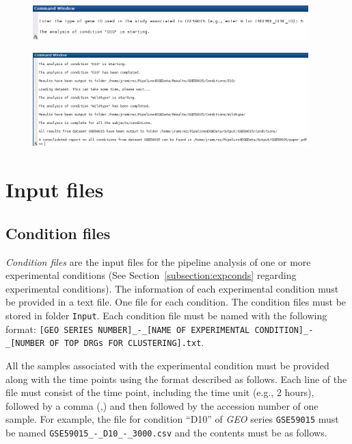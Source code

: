 \documentclass[final,letterpaper,12pt]{article}
\begin{document}
\begin{figure}
	\centering
	\includegraphics[width=0.95\textwidth]{pipeline_ex5}
	\caption{}
	\label{fig:pipeline_ex5}
\end{figure}


\begin{figure}
	\centering
	\includegraphics[width=0.95\textwidth]{pipeline_ex6}
	\caption{}
	\label{fig:pipeline_ex6}
\end{figure}







\section{Input files}
\label{section:input_files}

\subsection{Condition files}
\label{section:condition_files}

\par \emph{Condition files} are the input files for the pipeline analysis of one or more experimental conditions (See Section~\ref{subsection:expconds} regarding experimental conditions). The information of each experimental condition must be provided in a text file. One file for each condition. The condition files must be stored in folder \texttt{Input}. Each condition file must be named with the following format: \texttt{[GEO SERIES NUMBER]\_-\_[NAME OF EXPERIMENTAL CONDITION]\_-\_[NUMBER OF TOP DRGs FOR CLUSTERING].txt}.

\par All the samples associated with the experimental condition must be provided along with the time points using the format described as follows. Each line of the file must consist of the time point, including the time unit (e.g., 2 hours), followed by a comma (,) and then followed by the accession number of one sample. For example, the file for condition ``D10'' of \textit{GEO} series \texttt{GSE59015} must be named \texttt{GSE59015\_-\_D10\_-\_3000.csv} and the contents must be as follows.
\end{document}
